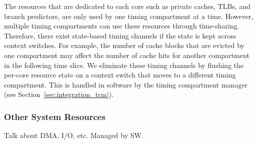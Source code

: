 The resources that are dedicated to each core such as private caches,
TLBs, and branch predictors, are only used by one timing compartment at a time.
However, multiple timing compartments can use these resources through 
time-sharing. Therefore, there exist state-based timing channels if the state is
kept across context switches. For example, the number of cache blocks that
are evicted by one compartment may affect the number of cache hits for
another compartment in the following time slice.
We eliminate these timing channels by flushing the per-core resource state 
on a context switch that moves to a different timing compartment.
This is handled in software by the timing compartment 
manager (see Section~\ref{sec:integration_tcm}).

\subsubsection{Other System Resources}

Talk about DMA, I/O, etc. Managed by SW.
